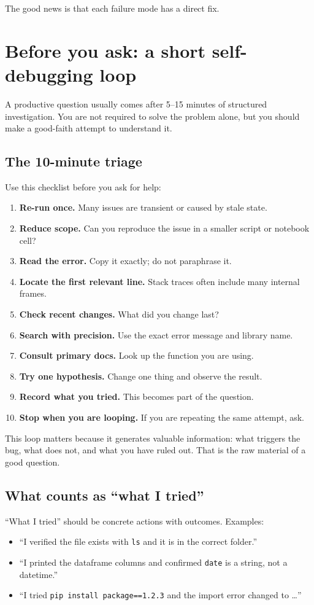 The good news is that each failure mode has a direct fix.

\section{Before you ask: a short self-debugging loop}
A productive question usually comes after 5--15 minutes of structured investigation. You are not required to solve the problem alone, but you should make a good-faith attempt to understand it.

\subsection{The 10-minute triage}
Use this checklist before you ask for help:
\begin{enumerate}[noitemsep]
  \item \textbf{Re-run once.} Many issues are transient or caused by stale state.
  \item \textbf{Reduce scope.} Can you reproduce the issue in a smaller script or notebook cell?
  \item \textbf{Read the error.} Copy it exactly; do not paraphrase it.
  \item \textbf{Locate the first relevant line.} Stack traces often include many internal frames.
  \item \textbf{Check recent changes.} What did you change last?
  \item \textbf{Search with precision.} Use the exact error message and library name.
  \item \textbf{Consult primary docs.} Look up the function you are using.
  \item \textbf{Try one hypothesis.} Change one thing and observe the result.
  \item \textbf{Record what you tried.} This becomes part of the question.
  \item \textbf{Stop when you are looping.} If you are repeating the same attempt, ask.
\end{enumerate}

This loop matters because it generates valuable information: what triggers the bug, what does not, and what you have ruled out. That is the raw material of a good question.

\subsection{What counts as ``what I tried''}
``What I tried'' should be concrete actions with outcomes. Examples:
\begin{itemize}[noitemsep]
  \item ``I verified the file exists with \texttt{ls} and it is in the correct folder.''
  \item ``I printed the dataframe columns and confirmed \texttt{date} is a string, not a datetime.''
  \item ``I tried \texttt{pip install package==1.2.3} and the import error changed to \ldots''
\end{itemize}

